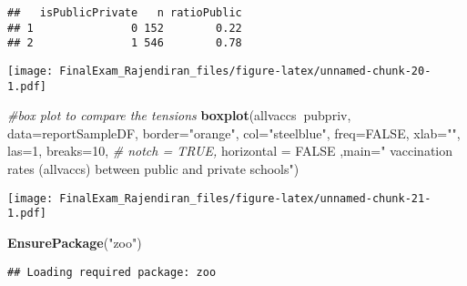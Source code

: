 \documentclass[]{article}
\newenvironment{Shaded}{\begin{snugshade}}{\end{snugshade}}
\newcommand{\CommentTok}[1]{\textcolor[rgb]{0.56,0.35,0.01}{\textit{#1}}}
\newcommand{\DataTypeTok}[1]{\textcolor[rgb]{0.13,0.29,0.53}{#1}}
\newcommand{\DecValTok}[1]{\textcolor[rgb]{0.00,0.00,0.81}{#1}}
\newcommand{\KeywordTok}[1]{\textcolor[rgb]{0.13,0.29,0.53}{\textbf{#1}}}
\newcommand{\NormalTok}[1]{#1}
\newcommand{\OperatorTok}[1]{\textcolor[rgb]{0.81,0.36,0.00}{\textbf{#1}}}
\newcommand{\OtherTok}[1]{\textcolor[rgb]{0.56,0.35,0.01}{#1}}
\newcommand{\StringTok}[1]{\textcolor[rgb]{0.31,0.60,0.02}{#1}}
\begin{document}
\begin{verbatim}
##   isPublicPrivate   n ratioPublic
## 1               0 152        0.22
## 2               1 546        0.78
\end{verbatim}

\begin{Shaded}
\end{Shaded}

\texttt{[image: FinalExam\_Rajendiran\_files/figure-latex/unnamed-chunk-20-1.pdf]}

\begin{Shaded}
\begin{Highlighting}[]
\CommentTok{#box plot to compare the tensions}
\KeywordTok{boxplot}\NormalTok{(allvaccs}\OperatorTok{~}\NormalTok{pubpriv, }\DataTypeTok{data=}\NormalTok{reportSampleDF,}
       \DataTypeTok{border=}\StringTok{"orange"}\NormalTok{, }
       \DataTypeTok{col=}\StringTok{"steelblue"}\NormalTok{,}
       \DataTypeTok{freq=}\OtherTok{FALSE}\NormalTok{,}
       \DataTypeTok{xlab=}\StringTok{""}\NormalTok{,}
       \DataTypeTok{las=}\DecValTok{1}\NormalTok{, }
       \DataTypeTok{breaks=}\DecValTok{10}\NormalTok{,}
       \CommentTok{# notch = TRUE,}
       \DataTypeTok{horizontal =} \OtherTok{FALSE}\NormalTok{ ,}\DataTypeTok{main=}\StringTok{" vaccination rates (allvaccs) between public and private schools"}\NormalTok{)}
\end{Highlighting}
\end{Shaded}

\texttt{[image: FinalExam\_Rajendiran\_files/figure-latex/unnamed-chunk-21-1.pdf]}

\begin{Shaded}
\begin{Highlighting}[]
\KeywordTok{EnsurePackage}\NormalTok{(}\StringTok{"zoo"}\NormalTok{)}
\end{Highlighting}
\end{Shaded}

\begin{verbatim}
## Loading required package: zoo
\end{verbatim}
\end{document}
